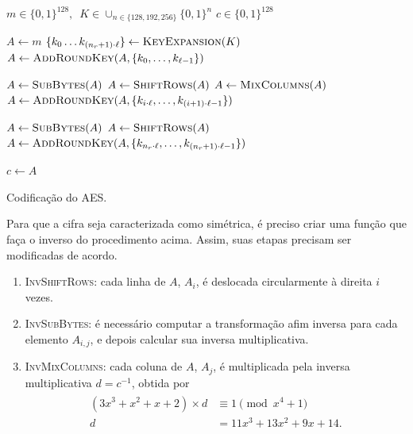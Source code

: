 \documentclass{ufsctex/ufsctex}
\newcommand{\binwds}[1]{\{0, 1\}^{#1}}
\begin{document}
\begin{algorithm}
  \begin{algorithmic}
    \REQUIRE{}  $m \in \binwds{128}, \enspace
      K \in \cup_{n \in \{128, 192, 256\}} \binwds{n}$
    \ENSURE{}  $c \in \binwds{128}$ 

    \STATE{}  $A \leftarrow m$
    \STATE{}  $\{k_{0} \dots k_{(n_r + 1) \cdot \ell}\}
      \leftarrow \textsc{KeyExpansion}(K)$
    \STATE{}  $A \leftarrow \textsc{AddRoundKey}(A,
      \{k_{0}, \dots, k_{\ell - 1}\})$

      \STATE{}  $A \leftarrow \textsc{SubBytes}(A)$
      \STATE{}  $A \leftarrow \textsc{ShiftRows}(A)$
      \STATE{}  $A \leftarrow \textsc{MixColumns}(A)$
      \STATE{}  $A \leftarrow \textsc{AddRoundKey}(A,
        \{k_{i \cdot \ell}, \dots, k_{(i + 1) \cdot \ell - 1}\})$
    \ENDFOR{}

    \STATE{}  $A \leftarrow \textsc{SubBytes}(A)$
    \STATE{}  $A \leftarrow \textsc{ShiftRows}(A)$
    \STATE{}  $A \leftarrow \textsc{AddRoundKey}(A,
      \{k_{n_r \cdot \ell}, \dots, k_{(n_r + 1) \cdot \ell - 1}\})$

    \STATE{}  $c \leftarrow A$
  \end{algorithmic}
  \caption{Codificação do AES.}\label{alg:aesencrypt}
\end{algorithm}

Para que a cifra seja caracterizada como simétrica, é preciso criar uma função
que faça o inverso do procedimento acima. Assim, suas etapas precisam ser
modificadas de acordo.

\begin{enumerate}[label=\roman*.]

  \item \textsc{InvShiftRows}: cada linha de $A$, $A_i$, é deslocada
      circularmente à direita $i$ vezes.

  \item \textsc{InvSubBytes}: é necessário computar a transformação afim
      inversa para cada elemento $A_{i, j}$, e depois calcular sua inversa
        multiplicativa.

  \item \textsc{InvMixColumns}: cada coluna de $A$, $A_j$, é multiplicada pela
      inversa multiplicativa $d = c^{-1}$, obtida por
        \begin{align}
          \begin{split}
            (3 x^{3} + x^{2} + x + 2) \times d &\equiv 1 \pmod{x^{4} + 1} \\
            d &= 11 x^{3} + 13 x^{2} + 9 x + 14.
          \end{split}
        \end{align}

\end{enumerate}
\end{document}
